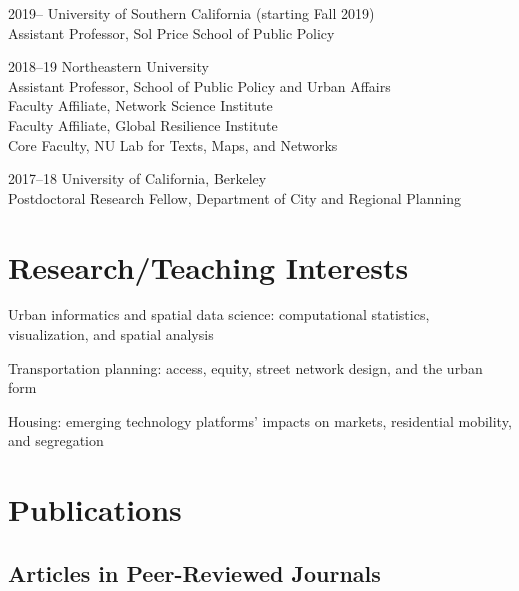\documentclass[12pt,letterpaper]{report}
\newcommand{\listitemspace}{0.15em}
\renewenvironment{itemize}
{\begin{list}{}{\setlength{\leftmargin}{0em}
			\setlength{\parskip}{0em}
			\setlength{\itemsep}{\listitemspace}
			\setlength{\parsep}{\listitemspace}}}
	{\end{list}}
\begin{document}
	\begin{tablist}

		\item[2019--] 	\tab University of Southern California (starting Fall 2019) \\
							 Assistant Professor, Sol Price School of Public Policy

		\item[2018--19] \tab Northeastern University \\
							 Assistant Professor, School of Public Policy and Urban Affairs \\
							 Faculty Affiliate, Network Science Institute \\
							 Faculty Affiliate, Global Resilience Institute \\
							 Core Faculty, NU Lab for Texts, Maps, and Networks

		\item[2017--18] \tab University of California, Berkeley \\
							 Postdoctoral Research Fellow, Department of City and Regional Planning

	\end{tablist}



	\section*{Research/Teaching Interests}

	\begin{itemize}

		\item Urban informatics and spatial data science: computational statistics, visualization, and spatial analysis

		\item Transportation planning: access, equity, street network design, and the urban form

		\item Housing: emerging technology platforms' impacts on markets, residential mobility, and segregation

	\end{itemize}



	\section*{Publications}

	\subsection*{Articles in Peer-Reviewed Journals}
\end{document}
